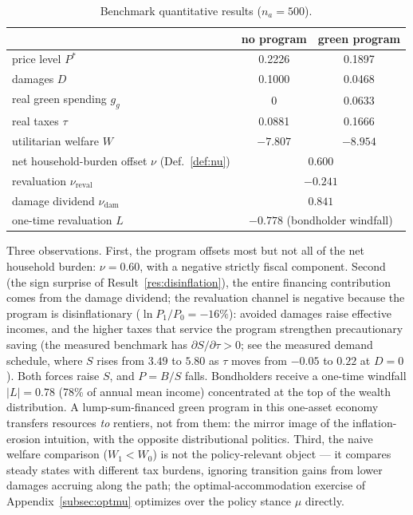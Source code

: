 \documentclass[12pt]{article}
\newcommand{\Sfun}{S}
\begin{document}
\begin{table}[!htb]
\centering
\caption{Benchmark quantitative results ($n_a=500$).}
\label{tab:benchmark}
\begin{tabular}{lcc}
\toprule
 & no program & green program \\
\midrule
price level $P^{*}$            & 0.2226 & 0.1897 \\
damages $D$                    & 0.1000 & 0.0468 \\
real green spending $g_g$      & 0      & 0.0633 \\
real taxes $\tau$              & 0.0881 & 0.1666 \\
utilitarian welfare $W$        & $-7.807$ & $-8.954$ \\
\midrule
net household-burden offset $\nu$ (Def.~\ref{def:nu}) & \multicolumn{2}{c}{$0.600$} \\
\quad revaluation $\nu_{\mathrm{reval}}$ & \multicolumn{2}{c}{$-0.241$} \\
\quad damage dividend $\nu_{\mathrm{dam}}$ & \multicolumn{2}{c}{$0.841$} \\
one-time revaluation $L$       & \multicolumn{2}{c}{$-0.778$ (bondholder windfall)} \\
\bottomrule
\end{tabular}
\end{table}

Three observations. First, the program offsets most but not all of the net
household burden: $\nu=0.60$, with a negative strictly fiscal component. Second (the sign surprise of
Result~\ref{res:disinflation}), the entire financing contribution comes from
the damage dividend; the revaluation channel is negative because the
program is disinflationary ($\ln P_1/P_0 = -16\%$): avoided damages raise
effective incomes, and the higher taxes that service the program strengthen
precautionary saving (the measured benchmark has
$\partial\Sfun/\partial\tau>0$; see the measured demand schedule,
where $\Sfun$ rises from $3.49$ to $5.80$ as $\tau$ moves from $-0.05$ to
$0.22$ at $D=0$). Both forces raise $\Sfun$, and $P=B/\Sfun$ falls.
Bondholders receive a one-time windfall $|L|=0.78$ (78\% of annual mean
income) concentrated at the top of the wealth distribution. A lump-sum-financed green program
in this one-asset economy transfers resources \emph{to} rentiers, not from them: the
mirror image of the inflation-erosion intuition, with the opposite
distributional politics. Third, the naive welfare comparison
($W_1<W_0$) is not the policy-relevant object --- it compares steady states
with different tax burdens, ignoring transition gains from lower damages
accruing along the path; the optimal-accommodation exercise of
Appendix~\ref{subsec:optmu} optimizes over the policy stance $\mu$
directly.
\end{document}
